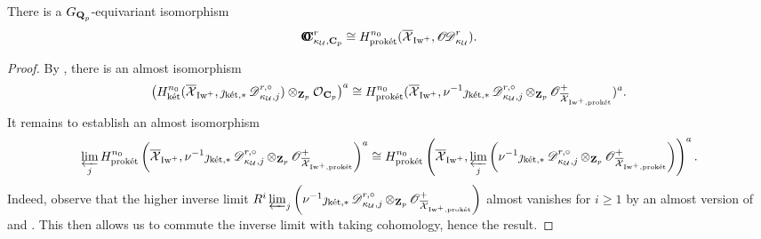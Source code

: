\begin{Proposition}\label{Proposition: overconvergent cohomology computed by the pro-Kummer etale cohomology}
There is a $G_{\Q_p}$-equivariant isomorphism $$\OC_{\kappa_{\calU}, \C_p}^r\cong H_{\proket}^{n_0}(\overline{\calX}_{\Iw^+}, \sheafOD_{\kappa_{\calU}}^r).$$
\end{Proposition}
\begin{proof}
By \cite[Theorem 6.2.1 \& Corollary 6.3.4]{Diao}, there is an almost isomorphism $$\left(H^{n_0}_{\ket}(\overline{\calX}_{\Iw^+}, \jmath_{\ket, *}\scrD_{\kappa_{\calU}, j}^{r, \circ})\otimes_{\Z_p}\calO_{\C_p}\right)^a\cong H_{\proket}^{n_0}(\overline{\calX}_{\Iw^+}, \nu^{-1}\jmath_{\ket, *}\scrD_{\kappa_{\calU}, j}^{r, \circ}\otimes_{\Z_p}\scrO_{\overline{\calX}_{\Iw^+, \proket}}^+)^a.$$ It remains to establish an almost isomorphism $$\varprojlim_{j} H_{\proket}^{n_0}\left(\overline{\calX}_{\Iw^+}, \nu^{-1}\jmath_{\ket, *}\scrD_{\kappa_{\calU}, j}^{r, \circ}\otimes_{\Z_p}\scrO_{\overline{\calX}_{\Iw^+, \proket}}^+\right)^a\cong H_{\proket}^{n_0}\left(\overline{\calX}_{\Iw^+}, \varprojlim_j\left(\nu^{-1}\jmath_{\ket, *}\scrD_{\kappa_{\calU}, j}^{r, \circ}\otimes_{\Z_p}\scrO_{\overline{\calX}_{\Iw^+, \proket}}^+\right)\right)^a.$$ Indeed, observe that the higher inverse limit $R^i \varprojlim_j\left(\nu^{-1}\jmath_{\ket, *}\scrD_{\kappa_{\calU}, j}^{r, \circ}\otimes_{\Z_p}\scrO_{\overline{\calX}_{\Iw^+, \proket}}^+\right)$ almost vanishes for $i\geq 1$ by an almost version of \cite[Lemma 3.18]{Scholze_2013} and \cite[Proposition 6.1.11]{Diao}. This then allows us to commute the inverse limit with taking cohomology, hence the result.
\end{proof}

